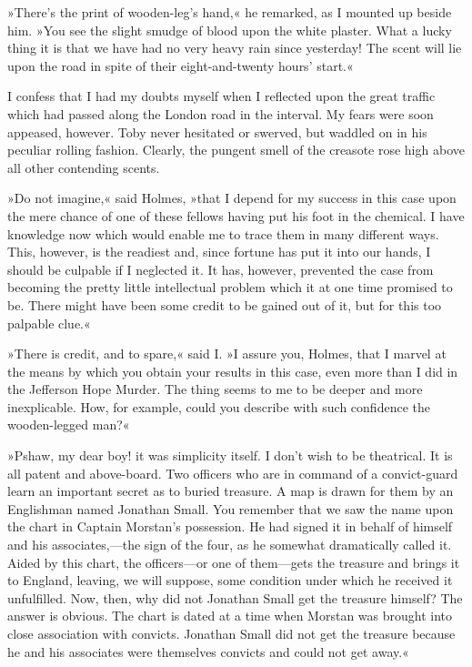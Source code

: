 »There's the print of wooden-leg's hand,« he remarked, as I mounted up beside him. »You see the slight smudge of blood upon the white plaster. What a lucky thing it is that we have had no very heavy rain since yesterday! The scent will lie upon the road in spite of their eight-and-twenty hours' start.«

I confess that I had my doubts myself when I reflected upon the great traffic which had passed along the London road in the interval. My fears were soon appeased, however. Toby never hesitated or swerved, but waddled on in his peculiar rolling fashion. Clearly, the pungent smell of the creasote rose high above all other contending scents.

»Do not imagine,« said Holmes, »that I depend for my success in this case upon the mere chance of one of these fellows having put his foot in the chemical. I have knowledge now which would enable me to trace them in many different ways. This, however, is the readiest and, since fortune has put it into our hands, I should be culpable if I neglected it. It has, however, prevented the case from becoming the pretty little intellectual problem which it at one time promised to be. There might have been some credit to be gained out of it, but for this too palpable clue.«

»There is credit, and to spare,« said I. »I assure you, Holmes, that I marvel at the means by which you obtain your results in this case, even more than I did in the Jefferson Hope Murder. The thing seems to me to be deeper and more inexplicable. How, for example, could you describe with such confidence the wooden-legged man?«

»Pshaw, my dear boy! it was simplicity itself. I don't wish to be theatrical. It is all patent and above-board. Two officers who are in command of a convict-guard learn an important secret as to buried treasure. A map is drawn for them by an Englishman named Jonathan Small. You remember that we saw the name upon the chart in Captain Morstan's possession. He had signed it in behalf of himself and his associates,—the sign of the four, as he somewhat dramatically called it. Aided by this chart, the officers—or one of them—gets the treasure and brings it to England, leaving, we will suppose, some condition under which he received it unfulfilled. Now, then, why did not Jonathan Small get the treasure himself? The answer is obvious. The chart is dated at a time when Morstan was brought into close association with convicts. Jonathan Small did not get the treasure because he and his associates were themselves convicts and could not get away.«

